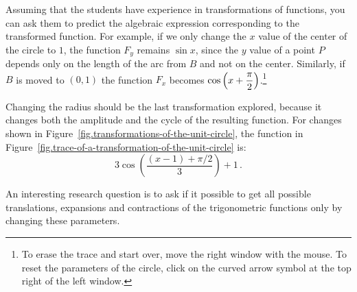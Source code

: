 Assuming that the students have experience in transformations of functions, you can ask them to predict the algebraic expression corresponding to the transformed function.
For example, if we only change the $x$ value of the center of the circle to $1$,  the function $F_y$ remains $\sin x$, since the $y$ value of a point $P$ depends only on the length of the arc from $B$ and not on the center.
Similarly, if $B$ is moved to $(0,1)$ the function $F_x$ becomes $\cos\left(x + \displaystyle\frac{\pi}{2}\right)$.\footnote{To erase the trace and start over, move the right window with the mouse. To reset the parameters of the circle, click on the curved arrow symbol at the top right of the left window.}

Changing the radius should be the last transformation explored, because it changes both the amplitude and the cycle of the resulting function.
For changes shown in Figure~\ref{fig.transformations-of-the-unit-circle}, the function in Figure~\ref{fig.trace-of-a-transformation-of-the-unit-circle} is:
\[
3\cos\left(\frac{(x-1)+\pi/2}{3}\right)+1\,.
\]

An interesting research question is to ask if it possible to get all possible translations, expansions and contractions of the trigonometric functions only by changing these parameters.


